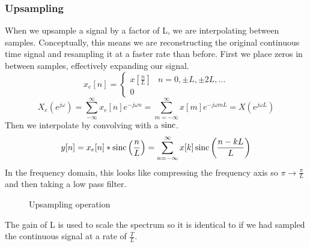 \subsubsection{Upsampling}
When we upsample a signal by a factor of L, we are interpolating between samples. 
Conceptually, this means we are reconstructing the original continuous time signal and resampling it at a faster rate than before.
First we place zeros in between samples, effectively expanding our signal.
\[
  x_e[n] = \begin{cases}
    x\left[\frac{n}{L}\right] & n=0, \pm L, \pm 2L,...\\
    0
  \end{cases}
\]
\[
  X_e(e^{j\omega})=\sum_{-\infty}^{\infty}x_e[n]e^{-j\omega n}=\sum_{m=-\infty}^{\infty}x[m]e^{-j\omega mL} = X\left(e^{j\omega L}\right)
\]
Then we interpolate by convolving with a $\operatorname*{sinc}$.
\[
  y[n] = x_e[n]*\operatorname*{sinc}\left(\frac{n}{L}\right) = \sum_{n=-\infty}^{\infty}{x[k]\operatorname*{sinc}\left(\frac{n-kL}{L}\right)}
\]
In the frequency domain, this looks like compressing the frequency axis so $\pi \rightarrow \frac{\pi}{L}$ and then taking a low pass filter.
\begin{gitbook-image}
\begin{figure}[!h]
  \centering
  \caption{Upsampling operation}
  \label{fig:upsample}
\end{figure}
\end{gitbook-image}
The gain of L is used to scale the spectrum so it is identical to if we had sampled the continuous signal at a rate of $\frac{T}{L}$.
